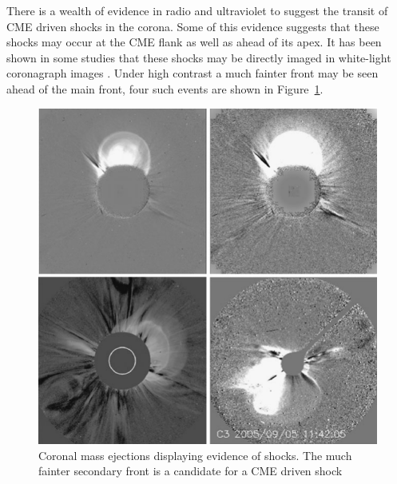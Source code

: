 There is a wealth of evidence in radio and ultraviolet to suggest the transit of CME driven shocks in the corona. Some of this evidence suggests that these shocks may occur at the CME flank as well as ahead of its apex. It has been shown in some studies that these shocks may be directly imaged in white-light coronagraph images \citep{vourlidas2012, vourlidas2013}. Under high contrast a much fainter front may be seen ahead of the main front, four such events are shown in Figure~\ref{fig:wl_shock}. 
\begin{figure}[!t]
\begin{center}
\includegraphics[scale=0.9, trim=0cm 0cm 0cm 0.5cm]{images/wl_shock.pdf}
\caption[White-light image of shocks]{Coronal mass ejections displaying evidence of shocks. The much fainter secondary front is a candidate for a CME driven shock \citep{vourlidas2013}}
\label{fig:wl_shock}
\end{center}
\end{figure}
